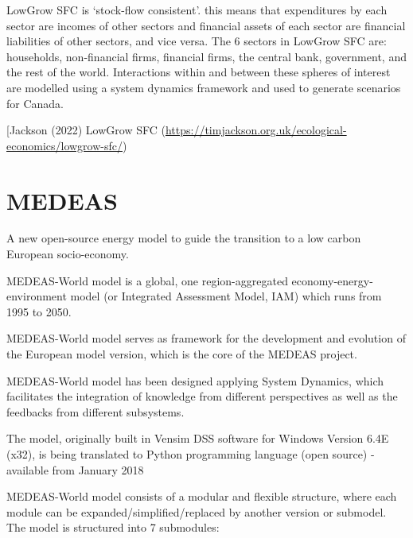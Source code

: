 \documentclass[
]{book}
\begin{document}
LowGrow SFC is `stock-flow consistent'. this means that expenditures by each sector are incomes of other sectors and financial assets of each sector are financial liabilities of other sectors, and vice versa. The 6 sectors in LowGrow SFC are: households, non-financial firms, financial firms, the central bank, government, and the rest of the world. Interactions within and between these spheres of interest are modelled using a system dynamics framework and used to generate scenarios for Canada.

{[}Jackson (2022) LowGrow SFC (\url{https://timjackson.org.uk/ecological-economics/lowgrow-sfc/})

\hypertarget{medeas}{%
\section{MEDEAS}\label{medeas}}

A new open-source energy model to guide the transition to a low carbon European socio-economy.

MEDEAS-World model is a global, one region-aggregated economy-energy-environment model (or Integrated Assessment Model, IAM) which runs from 1995 to 2050.

MEDEAS-World model serves as framework for the development and evolution of the European model version, which is the core of the MEDEAS project.

MEDEAS-World model has been designed applying System Dynamics, which facilitates the integration of knowledge from different perspectives as well as the feedbacks from different subsystems.

The model, originally built in Vensim DSS software for Windows Version 6.4E (x32), is being translated to Python programming language (open source) - available from January 2018

MEDEAS-World model consists of a modular and flexible structure, where each module can be expanded/simplified/replaced by another version or submodel. The model is structured into 7 submodules:
\end{document}
